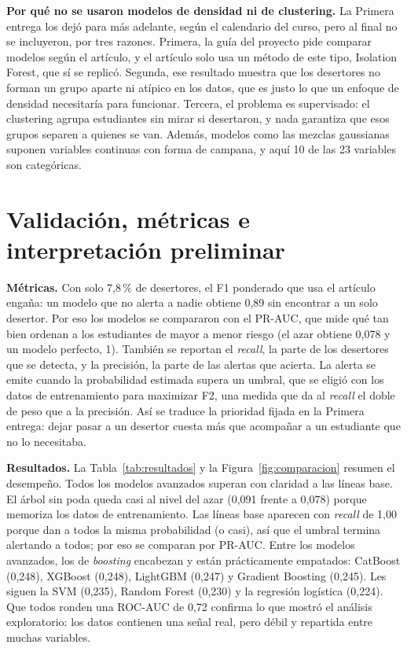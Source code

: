 \documentclass[11pt,a4paper]{article}
\begin{document}
\textbf{Por qué no se usaron modelos de densidad ni de clustering.} La Primera entrega los dejó para más adelante, según el calendario del curso, pero al final no se incluyeron, por tres razones. Primera, la guía del proyecto pide comparar modelos según el artículo, y el artículo solo usa un método de este tipo, Isolation Forest, que sí se replicó. Segunda, ese resultado muestra que los desertores no forman un grupo aparte ni atípico en los datos, que es justo lo que un enfoque de densidad necesitaría para funcionar. Tercera, el problema es supervisado: el clustering agrupa estudiantes sin mirar si desertaron, y nada garantiza que esos grupos separen a quienes se van. Además, modelos como las mezclas gaussianas suponen variables continuas con forma de campana, y aquí 10 de las 23 variables son categóricas.

\section{Validación, métricas e interpretación preliminar}

\textbf{Métricas.} Con solo 7,8\,\% de desertores, el F1 ponderado que usa el artículo engaña: un modelo que no alerta a nadie obtiene 0,89 sin encontrar a un solo desertor. Por eso los modelos se compararon con el PR-AUC, que mide qué tan bien ordenan a los estudiantes de mayor a menor riesgo (el azar obtiene 0,078 y un modelo perfecto, 1). También se reportan el \textit{recall}, la parte de los desertores que se detecta, y la precisión, la parte de las alertas que acierta. La alerta se emite cuando la probabilidad estimada supera un umbral, que se eligió con los datos de entrenamiento para maximizar F2, una medida que da al \textit{recall} el doble de peso que a la precisión. Así se traduce la prioridad fijada en la Primera entrega: dejar pasar a un desertor cuesta más que acompañar a un estudiante que no lo necesitaba.

\textbf{Resultados.} La Tabla~\ref{tab:resultados} y la Figura~\ref{fig:comparacion} resumen el desempeño. Todos los modelos avanzados superan con claridad a las líneas base. El árbol sin poda queda casi al nivel del azar (0,091 frente a 0,078) porque memoriza los datos de entrenamiento. Las líneas base aparecen con \textit{recall} de 1,00 porque dan a todos la misma probabilidad (o casi), así que el umbral termina alertando a todos; por eso se comparan por PR-AUC. Entre los modelos avanzados, los de \textit{boosting} encabezan y están prácticamente empatados: CatBoost (0,248), XGBoost (0,248), LightGBM (0,247) y Gradient Boosting (0,245). Les siguen la SVM (0,235), Random Forest (0,230) y la regresión logística (0,224). Que todos ronden una ROC-AUC de 0,72 confirma lo que mostró el análisis exploratorio: los datos contienen una señal real, pero débil y repartida entre muchas variables.
\end{document}
